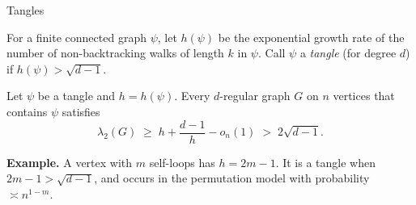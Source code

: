 \documentclass[aspectratio=169,10pt]{beamer}
\newcommand{\edge}{2\sqrt{d-1}}
\begin{document}
\begin{frame}{Tangles}
  \begin{definition}
    For a finite connected graph $\psi$, let $h(\psi)$ be the exponential growth rate of the number
    of non-backtracking walks of length $k$ in $\psi$. Call $\psi$ a \emph{tangle} (for degree $d$) if
    $h(\psi)>\sqrt{d-1}$.
  \end{definition}
  \begin{theorem}[Friedman]
    Let $\psi$ be a tangle and $h=h(\psi)$. Every $d$-regular graph $G$ on $n$ vertices that contains $\psi$ satisfies
    \[
      \lambda_2(G)\;\ge\;h+\frac{d-1}{h}-o_n(1)\;>\;\edge .
    \]
    \vspace{-5mm}
  \end{theorem}
  \textbf{Example.} A vertex with $m$ self-loops has $h=2m-1$. It is a tangle when $2m-1>\sqrt{d-1}$,
  and occurs in the permutation model with probability $\asymp n^{1-m}$.
\end{frame}
\end{document}
